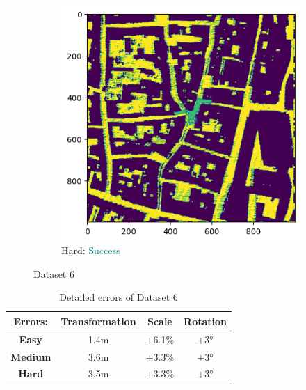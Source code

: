 \documentclass[11pt]{article}
\begin{document}
\begin{figure}[p]
        \vspace{1em}

        \begin{subfigure}{0.45\textwidth}
            \centering
            \includegraphics[width=\linewidth]{images/full/hard/5_7_1_hard}
            \caption{Hard: \textcolor{teal}{Success}}
            \label{fig:5_7_1_hard}
        \end{subfigure}
        \hfill

        \caption{Dataset 6}
        \label{fig:res_5_7_1}
    \end{figure}

    \begin{table}[p]
        \centering
        \begin{tabular}{|c|c|c|c|}
          \hline
          \textbf{Errors:} & \textbf{Transformation} & \textbf{Scale} & \textbf{Rotation} \\
          \hline
          \textbf{Easy}   & 1.4m  & +6.1\% & +3° \\
          \hline
          \textbf{Medium} & 3.6m  & +3.3\% & +3° \\
          \hline
          \textbf{Hard}   & 3.5m  & +3.3\% & +3° \\
          \hline
        \end{tabular}
        \caption{Detailed errors of Dataset 6}
        \label{tab:simpletable}
    \end{table}
\end{document}
